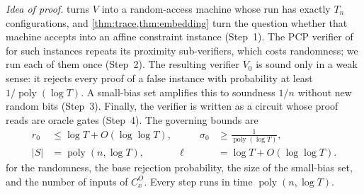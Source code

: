 \documentclass[11pt,letterpaper]{article}
\theoremstyle{definition}
\theoremstyle{remark}
\newcommand{\poly}{\operatorname{poly}}
\newcommand{\abs}[1]{\left|#1\right|}
\begin{document}
\emph{Idea of proof.}  turns \(V\) into a random-access
machine whose run has exactly \(T_n\) configurations, and
\cref{thm:trace,thm:embedding} turn the question whether that machine
accepts into an affine constraint instance (Step~1). The PCP verifier
of~\cite{BCGT13} for such
instances repeats its proximity sub-verifiers, which costs randomness;
we run each of them once (Step~2). The resulting verifier \(V_0\) is
sound only in a weak sense: it rejects every proof of a false instance
with probability at least \(1/\poly(\log T)\). A small-bias set amplifies this to soundness
\(1/n\) without new random bits (Step~3). Finally, the verifier is
written as a circuit whose proof reads are oracle gates (Step~4). The
governing bounds are
\[
 \begin{aligned}
 r_0&\le\log T+O(\log\log T),&\qquad
 \sigma_0&\ge\frac1{\poly(\log T)},\\
 \abs S&=\poly(n,\log T),&
 \ell&=\log T+O(\log\log T).
 \end{aligned}
\]
for the randomness, the base rejection probability, the size of the
small-bias set, and the number of inputs of \(C^O_x\). Every step runs
in time \(\poly(n,\log T)\).
\end{document}
